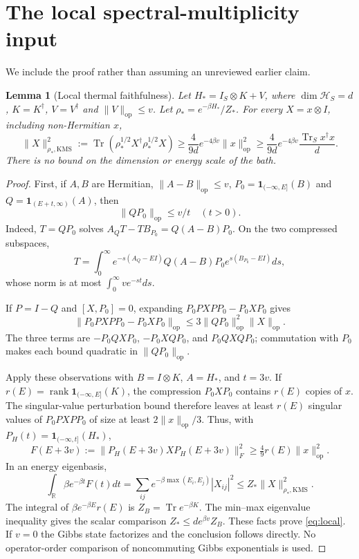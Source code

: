 \documentclass[11pt]{article}
\newtheorem{lemma}[theorem]{Lemma}
\theoremstyle{remark}\newtheorem{remark}[theorem]{Remark}
\DeclareMathOperator{\Tr}{Tr}\DeclareMathOperator{\supp}{supp}\DeclareMathOperator{\ad}{ad}\DeclareMathOperator{\Var}{Var}\DeclareMathOperator{\Cov}{Cov}\DeclareMathOperator{\rank}{rank}\DeclareMathOperator{\dist}{dist}
\newcommand{\op}[1]{\|#1\|_{\mathrm{op}}}
\newcommand{\ind}{\mathbf{1}}
\newcommand{\R}{\mathbb R}\newcommand{\C}{\mathbb C}
\begin{document}
\section{The local spectral-multiplicity input}
We include the proof rather than assuming an unreviewed earlier claim.
\begin{lemma}[Local thermal faithfulness]\label{lem:local}
Let $H_*=I_S\otimes K+V$, where $\dim\mathcal H_S=d$, $K=K^\dagger$, $V=V^\dagger$ and $\op V\le v$. Let $\rho_*=e^{-\beta H_*}/Z_*$. For every $X=x\otimes I$, including non-Hermitian $x$,
\begin{equation}\label{eq:local}
 \|X\|_{\rho_*,\mathrm{KMS}}^2:=\Tr(\rho_*^{1/2}X^\dagger\rho_*^{1/2}X)
 \ge \frac4{9d}e^{-4\beta v}\op x^2
 \ge \frac4{9d}e^{-4\beta v}\frac{\Tr_S x^\dagger x}{d}.
\end{equation}
There is no bound on the dimension or energy scale of the bath.
\end{lemma}
\begin{proof}
First, if $A,B$ are Hermitian, $\op{A-B}\le v$, $P_0=\ind_{(-\infty,E]}(B)$ and $Q=\ind_{(E+t,\infty)}(A)$, then
\begin{equation}\label{eq:transfer}
 \op{QP_0}\le v/t\quad(t>0).
\end{equation}
Indeed, $T=QP_0$ solves $A_QT-TB_{P_0}=Q(A-B)P_0$. On the two compressed subspaces,
\[
 T=\int_0^\infty e^{-s(A_Q-EI)}Q(A-B)P_0e^{s(B_{P_0}-EI)}ds,
\]
whose norm is at most $\int_0^\infty ve^{-st}ds$.

If $P=I-Q$ and $[X,P_0]=0$, expanding $P_0PXP P_0-P_0XP_0$ gives
\begin{equation}\label{eq:compression}
 \op{P_0PXP P_0-P_0XP_0}\le3\op{QP_0}^2\op X.
\end{equation}
The three terms are $-P_0QXP_0$, $-P_0XQP_0$, and $P_0QXQP_0$; commutation with $P_0$ makes each bound quadratic in $\op{QP_0}$.

Apply these observations with $B=I\otimes K$, $A=H_*$, and $t=3v$. If $r(E)=\rank\ind_{(-\infty,E]}(K)$, the compression $P_0XP_0$ contains $r(E)$ copies of $x$. The singular-value perturbation bound therefore leaves at least $r(E)$ singular values of $P_0PXP P_0$ of size at least $2\op x/3$. Thus, with $P_H(t)=\ind_{(-\infty,t]}(H_*)$,
\[
 F(E+3v):=\|P_H(E+3v)XP_H(E+3v)\|_F^2
 \ge\tfrac49r(E)\op x^2.
\]
In an energy eigenbasis,
\[
 \int_\R\beta e^{-\beta t}F(t)dt
 =\sum_{ij}e^{-\beta\max(E_i,E_j)}|X_{ij}|^2
 \le Z_*\|X\|_{\rho_*,\mathrm{KMS}}^2.
\]
The integral of $\beta e^{-\beta E}r(E)$ is $Z_B=\Tr e^{-\beta K}$. The min--max eigenvalue inequality gives the scalar comparison $Z_*\le de^{\beta v}Z_B$. These facts prove \eqref{eq:local}. If $v=0$ the Gibbs state factorizes and the conclusion follows directly. No operator-order comparison of noncommuting Gibbs exponentials is used.
\end{proof}
\end{document}
